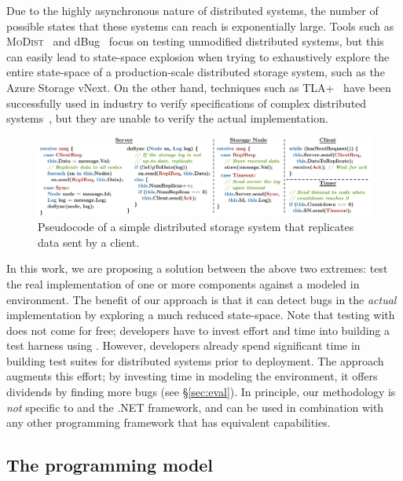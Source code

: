Due to the highly asynchronous nature of distributed systems, the number of possible states that these systems can reach is exponentially large. Tools such as \textsc{MoDist}~\cite{yang2009modist} and dBug~\cite{simsa2011dbug} focus on testing unmodified distributed systems, but this can easily lead to state-space explosion when trying to exhaustively explore the entire state-space of a production-scale distributed storage system, such as the Azure Storage vNext. On the other hand, techniques such as TLA+~\cite{lamport1994temporal} have been successfully used in industry to verify specifications of complex distributed systems~\cite{newcombe2015aws}, but they are unable to verify the actual implementation.

\begin{figure}[t]
\centering
\includegraphics[width=\linewidth]{img/example_code}
\vspace{-7mm}
\caption{Pseudocode of a simple distributed storage system that replicates data sent by a client.}
\label{fig:example}
\vspace{-2mm}
\end{figure}

In this work, we are proposing a solution between the above two extremes: test the real implementation of one or more components against a modeled in \psharp environment. The benefit of our approach is that it can detect bugs in the \emph{actual} implementation by exploring a much reduced state-space. Note that testing with \psharp does not come for free; developers have to invest effort and time into building a test harness using \psharp. However, developers already spend significant time in building test suites for distributed systems prior to deployment. The \psharp approach augments this effort; by investing time in modeling the environment, it offers dividends by finding more bugs (see \S\ref{sec:eval}). In principle, our methodology is \emph{not} specific to \psharp and the .NET framework, and can be used in combination with any other programming framework that has equivalent capabilities.

\vspace{-2mm}
\subsection{The \psharp programming model}
\label{sec:overview:psharp}

